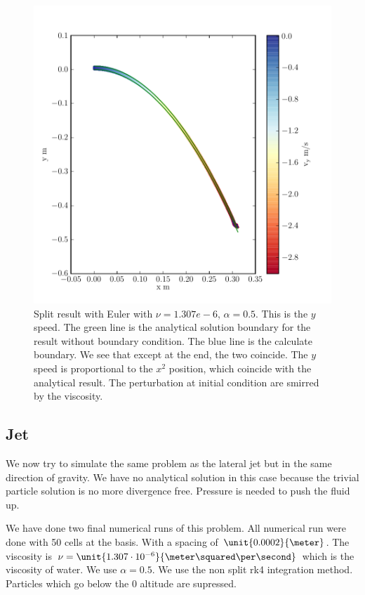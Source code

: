 \begin{figure}
	\includegraphics{topology/lateral_jet/plot_10__2_293.pdf}
			\caption{Split result with Euler with $\nu=1.307e-6$, $\alpha=0.5$.
	This is the $y$ speed.
	The green line is the analytical solution boundary for the result without boundary condition.
	The blue line is the calculate boundary.
	We see that except at the end, the two coincide.
	The $y$ speed is proportional to the $x^2$ position, which coincide with the analytical result.
	The perturbation at initial condition are smirred by the viscosity.}
	\label{topo:extrap:lateral:10_2}
\end{figure}


\subsection{Jet}

We now try to simulate the same problem as the lateral jet but in the same direction of gravity.
We have no analytical solution in this case because the trivial particle solution is no more divergence free.
Pressure is needed to push the fluid up.

We have done two final numerical runs of this problem.
All numerical run were done with 50 cells at the basis. With a spacing of $\unit{0.0002}{\meter}$.
The viscosity is $\nu=\unit{1.307\cdot 10^{-6}}{\meter \squared \per\second}$ which is the viscosity of water.
We use $\alpha=0.5$. We use the non split rk4 integration method.
Particles which go below the 0 altitude are supressed.

